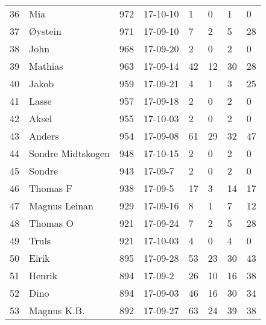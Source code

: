 \begin{longtable}{|r|l|r|l|l|l|l|l|}
36 &                  Mia &   972 &    17-10-10 &               1 &     0 &       1 &         0 \\
37 &              Øystein &   971 &    17-09-10 &               7 &     2 &       5 &        28 \\
38 &                 John &   968 &    17-09-20 &               2 &     0 &       2 &         0 \\
39 &              Mathias &   963 &    17-09-14 &              42 &    12 &      30 &        28 \\
40 &                Jakob &   959 &    17-09-21 &               4 &     1 &       3 &        25 \\
41 &                Lasse &   957 &    17-09-18 &               2 &     0 &       2 &         0 \\
42 &                Aksel &   955 &    17-10-03 &               2 &     0 &       2 &         0 \\
43 &               Anders &   954 &    17-09-08 &              61 &    29 &      32 &        47 \\
44 &    Sondre Midtskogen &   948 &    17-10-15 &               2 &     0 &       2 &         0 \\
45 &               Sondre &   943 &     17-09-7 &               2 &     0 &       2 &         0 \\
46 &             Thomas F &   938 &     17-09-5 &              17 &     3 &      14 &        17 \\
47 &        Magnus Leinan &   929 &    17-09-16 &               8 &     1 &       7 &        12 \\
48 &             Thomas O &   921 &    17-09-24 &               7 &     2 &       5 &        28 \\
49 &                Truls &   921 &    17-10-03 &               4 &     0 &       4 &         0 \\
50 &                Eirik &   895 &    17-09-28 &              53 &    23 &      30 &        43 \\
51 &               Henrik &   894 &     17-09-2 &              26 &    10 &      16 &        38 \\
52 &                 Dino &   894 &    17-09-03 &              46 &    16 &      30 &        34 \\
53 &          Magnus K.B. &   892 &    17-09-27 &              63 &    24 &      39 &        38 \\
\end{longtable}

